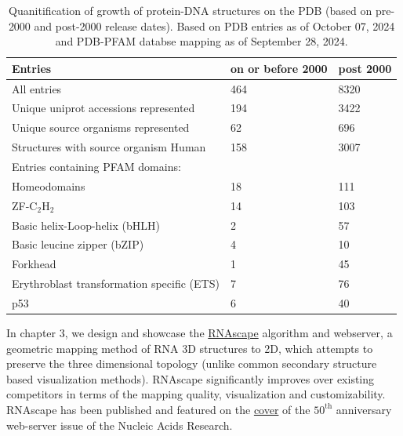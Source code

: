 \begin{table}[]
\centering
\begin{tabular}{|l|l|l|}
\hline
Entries & on or before 2000 & post 2000 \\
\hline
All entries & 464 & 8320  \\
Unique uniprot accessions represented & 194 & 3422  \\
Unique source organisms represented & 62 & 696 \\
Structures with source organism Human & 158 & 3007  \\
\hline
Entries containing PFAM domains: &  &  \\
\hline
Homeodomains & 18 & 111  \\
ZF-C$_2$H$_2$ & 14 & 103  \\
Basic helix-Loop-helix (bHLH) & 2 & 57  \\
Basic leucine zipper (bZIP) & 4 & 10   \\
Forkhead & 1 & 45   \\
Erythroblast transformation specific (ETS) & 7 & 76   \\
p53 & 6 & 40  \\
\hline
\end{tabular}
\caption[Quanitification of growth of protein-DNA structures on the PDB (based on pre-2000 and post-2000 release dates).]{Quanitification of growth of protein-DNA structures on the PDB (based on pre-2000 and post-2000 release dates). Based on PDB entries as of October 07, 2024 and PDB-PFAM databse mapping as of September 28, 2024.}
\label{table:intro}
\end{table}

In chapter 3, we design and showcase the  \href{https://rnascape.usc.edu/}{RNAscape} algorithm and webserver, a geometric mapping method of RNA 3D structures to 2D, which attempts to preserve the three dimensional topology (unlike common secondary structure based visualization methods). RNAscape significantly improves over existing competitors \citep{Yang2003} in terms of the mapping quality, visualization and customizability. RNAscape has been published \citep{Mitra2024rnascape} and featured on the \href{https://academic.oup.com/nar/issue/52/W1}{cover} of the $50^\text{th}$ anniversary web-server issue of the Nucleic Acids Research.

